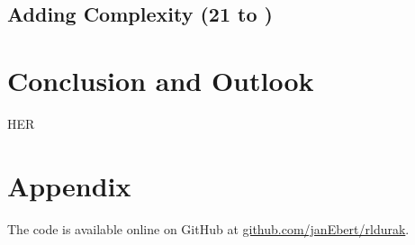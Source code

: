 \documentclass[a4paper,titlepage]{article}
\begin{document}
\subsection{Adding Complexity (21 to )} %

\newpage

\section{Conclusion and Outlook}

HER \cite{her}

\newpage

\section{Appendix}
\label{sec:appendix}

The code is available online on GitHub at \url{github.com/janEbert/rldurak}. \bigskip
\end{document}
